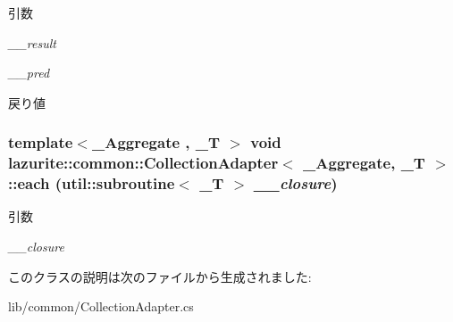 \begin{DoxyParams}{引数}
\item[{\em \_\-\_\-result}]\item[{\em \_\-\_\-pred}]\end{DoxyParams}
\begin{DoxyReturn}{戻り値}

\end{DoxyReturn}
\hypertarget{classlazurite_1_1common_1_1_collection_adapter_3_01___aggregate_00_01___t_01_4_a94683b605b7d99bd6599591214225d5f}{
\subsubsection[{each}]{\setlength{\rightskip}{0pt plus 5cm}template$<$\_\-Aggregate , \_\-T $>$ void lazurite::common::CollectionAdapter$<$ \_\-Aggregate, \_\-T $>$::each (util::subroutine$<$ \_\-T $>$ {\em \_\-\_\-closure})}}
\label{classlazurite_1_1common_1_1_collection_adapter_3_01___aggregate_00_01___t_01_4_a94683b605b7d99bd6599591214225d5f}

\begin{DoxyParams}{引数}
\item[{\em \_\-\_\-closure}]\end{DoxyParams}


このクラスの説明は次のファイルから生成されました:\begin{DoxyCompactItemize}
\item 
lib/common/CollectionAdapter.cs\end{DoxyCompactItemize}
